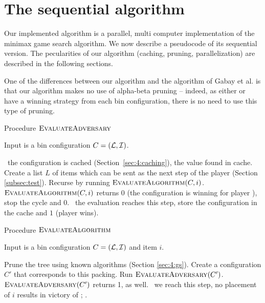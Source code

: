 \section{The sequential algorithm}\label{sec:minimax}

Our implemented algorithm is a parallel, multi computer implementation
of the minimax game search algorithm. We now describe a pseudocode of
its sequential version. The pecularities of our algorithm (caching,
pruning, parallelization) are described in the following sections.

One of the differences between our algorithm and the algorithm of
Gabay et al. \cite{gabay2013lbv2} is that our algorithm makes no use
of alpha-beta pruning -- indeed, as either \algo or \adversary have a
winning strategy from each bin configuration, there is no need to use
this type of pruning.

\begin{algorithm}
\caption{Procedure $\textsc{EvaluateAdversary}$}
Input is a bin configuration $C = ({\mathcal L}, {\mathcal I})$.
\begin{algorithmic}[1]
\State \algorithmicif\ the configuration is cached (Section~\ref{sec:4:caching}), \Return the value found in cache.
\State Create a list $L$ of items which can be sent as the next step of the player \adversary (Section \ref{subsec:test}).
\State Recurse by running $\textsc{EvaluateAlgorithm}(C,i)$.
\State \algorithmicif\ $\textsc{EvaluateAlgorithm}(C,i)$ returns $0$ (the configuration is winning for player \adversary), stop the cycle and \Return $0$.
\EndFor
\State \algorithmicif\ the evaluation reaches this step, store the configuration in the cache and \Return $1$ (player \algo wins).

\end{algorithmic}
\end{algorithm}


\begin{algorithm}
\caption{Procedure $\textsc{EvaluateAlgorithm}$}
Input is a bin configuration $C = ({\mathcal L},{\mathcal I})$ and item $i$.
\begin{algorithmic}[1]
\State Prune the tree using known algorithms (Section \ref{sec:4:gs}).
\State Create a configuration $C'$ that corresponds to this packing.
\State Run $\textsc{EvaluateAdversary}(C')$.
\State \algorithmicif\ $\textsc{EvaluateAdversary}(C')$ returns 1,  as well.
\EndIf
\EndFor
\State \algorithmicif\ we reach this step, no placement of $i$ results in victory of \algo; .
\end{algorithmic}
\end{algorithm}

